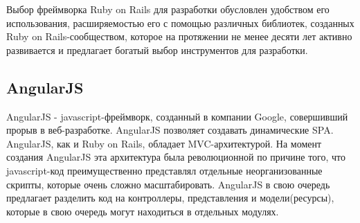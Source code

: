 Выбор фреймворка Ruby on Rails для разработки обусловлен удобством его использования, расширяемостью его с помощью различных библиотек, созданных Ruby on Rails-сообществом, которое на протяжении не менее десяти лет активно развивается и предлагает богатый выбор инструментов для разработки.

\subsection{AngularJS}
\label{sub:technologies:angular_js}
AngularJS - javascript-фреймворк, созданный в компании Google, совершивший прорыв в веб-разработке. AngularJS позволяет создавать динамические SPA. AngularJS, как и Ruby on Rails, обладает MVC-архитектурой. На момент создания AngularJS эта архитектура была революционной по причине того, что javascript-код преимущественно представлял отдельные неорганизованные скрипты, которые очень сложно масштабировать. AngularJS в свою очередь предлагает разделить код на контроллеры, представления и модели(ресурсы), которые в свою очередь могут находиться в отдельных модулях.
